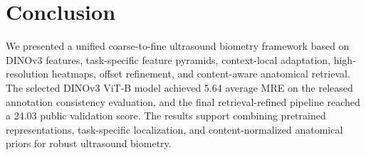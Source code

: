 \documentclass[runningheads]{llncs}
\begin{document}
\section{Conclusion}
We presented a unified coarse-to-fine ultrasound biometry framework based on DINOv3 features, task-specific feature pyramids, context-local adaptation, high-resolution heatmaps, offset refinement, and content-aware anatomical retrieval. The selected DINOv3 ViT-B model achieved 5.64 average MRE on the released annotation consistency evaluation, and the final retrieval-refined pipeline reached a 24.03 public validation score. The results support combining pretrained representations, task-specific localization, and content-normalized anatomical priors for robust ultrasound biometry.



\end{document}
